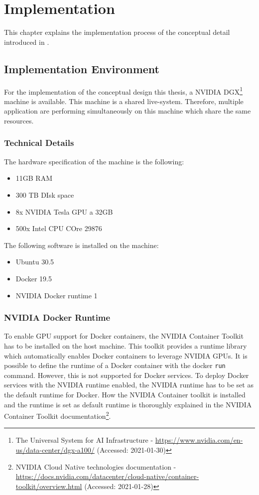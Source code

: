 \chapter{Implementation}
\label{chap:06_implementation}

This chapter explains the implementation process of the conceptual detail introduced in .


\section{Implementation Environment}
For the implementation of the conceptual design this thesis, a NVIDIA DGX\footnote{The Universal System for AI Infrastructure - \url{https://www.nvidia.com/en-us/data-center/dgx-a100/} (Accessed: 2021-01-30)} machine is available. 
This machine is a shared live-system. Therefore, multiple application are performing simultaneously on this machine which share the same resources.


\subsection{Technical Details}
The hardware specification of the machine is the following:
\begin{itemize}
\item 11GB RAM
\item 300 TB DIsk space 
\item 8x NVIDIA Tesla GPU a 32GB
\item 500x Intel CPU COre 29876
\end{itemize}


The following software is installed on the machine:
\begin{itemize}
\item Ubuntu 30.5
\item Docker 19.5
\item NVIDIA Docker runtime 1
\end{itemize}


\subsection{NVIDIA Docker Runtime}
To enable GPU support for Docker containers, the NVIDIA Container Toolkit has to be installed on the host machine. This toolkit provides a runtime library which automatically enables Docker containers to leverage NVIDIA GPUs.
It is possible to define the runtime of a Docker container with the docker \texttt{run} command. However, this is not supported for Docker services. To deploy Docker services with the NVIDIA runtime enabled, the NVIDIA runtime has to be set as the default runtime for Docker.
How the NVIDIA Container toolkit is installed and the runtime is set as default runtime is thoroughly explained in the NVIDIA Container Toolkit documentation\footnote{NVIDIA Cloud Native technologies documentation - \url{https://docs.nvidia.com/datacenter/cloud-native/container-toolkit/overview.html} (Accessed: 2021-01-28)}.

